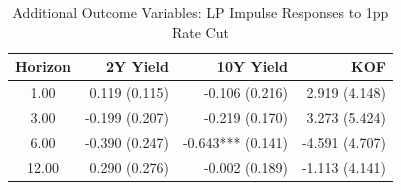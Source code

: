 \begin{table}[ht]
\centering
\caption{Additional Outcome Variables: LP Impulse Responses to 1pp Rate Cut} 
\label{tab:additional_outcomes}
\begin{tabular}{crrr}
  \toprule
Horizon & 2Y Yield & 10Y Yield & KOF \\ 
  \midrule
1.00 & 0.119 (0.115) & -0.106 (0.216) & 2.919 (4.148) \\ 
  3.00 & -0.199 (0.207) & -0.219 (0.170) & 3.273 (5.424) \\ 
  6.00 & -0.390 (0.247) & -0.643*** (0.141) & -4.591 (4.707) \\ 
  12.00 & 0.290 (0.276) & -0.002 (0.189) & -1.113 (4.141) \\ 
   \bottomrule
\end{tabular}
\end{table}
